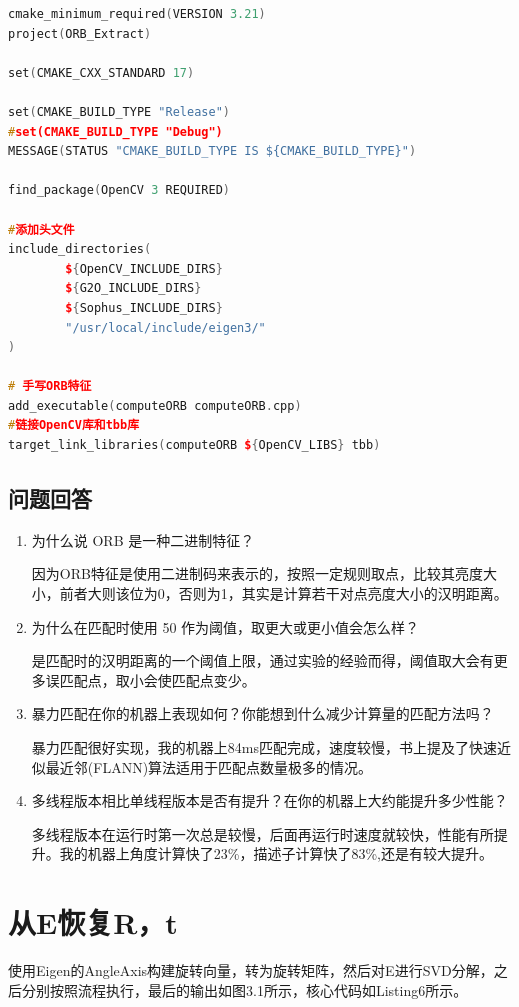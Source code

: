 \documentclass[40pt,a4paper，UTF8]{ctexart}
\numberwithin{equation}{section}
\begin{document}
\begin{lstlisting}[language=C++, caption=CMakeLists.txt]
cmake_minimum_required(VERSION 3.21)
project(ORB_Extract)

set(CMAKE_CXX_STANDARD 17)

set(CMAKE_BUILD_TYPE "Release")
#set(CMAKE_BUILD_TYPE "Debug")
MESSAGE(STATUS "CMAKE_BUILD_TYPE IS ${CMAKE_BUILD_TYPE}")

find_package(OpenCV 3 REQUIRED)

#添加头文件
include_directories(
        ${OpenCV_INCLUDE_DIRS}
        ${G2O_INCLUDE_DIRS}
        ${Sophus_INCLUDE_DIRS}
        "/usr/local/include/eigen3/"
)

# 手写ORB特征
add_executable(computeORB computeORB.cpp)
#链接OpenCV库和tbb库
target_link_libraries(computeORB ${OpenCV_LIBS} tbb)
\end{lstlisting}


\subsection{问题回答}
\begin{enumerate}
\item 为什么说 ORB 是一种二进制特征？

因为ORB特征是使用二进制码来表示的，按照一定规则取点，比较其亮度大小，前者大则该位为0，否则为1，其实是计算若干对点亮度大小的汉明距离。
\item 为什么在匹配时使用 50 作为阈值，取更大或更小值会怎么样？

是匹配时的汉明距离的一个阈值上限，通过实验的经验而得，阈值取大会有更多误匹配点，取小会使匹配点变少。

\item 暴力匹配在你的机器上表现如何？你能想到什么减少计算量的匹配方法吗？

暴力匹配很好实现，我的机器上84ms匹配完成，速度较慢，书上提及了快速近似最近邻(FLANN)算法适用于匹配点数量极多的情况。

\item 多线程版本相比单线程版本是否有提升？在你的机器上大约能提升多少性能？

多线程版本在运行时第一次总是较慢，后面再运行时速度就较快，性能有所提升。我的机器上角度计算快了23\%，描述子计算快了83\%,还是有较大提升。
\end{enumerate}

\section{从E恢复R，t}
使用Eigen的AngleAxis构建旋转向量，转为旋转矩阵，然后对E进行SVD分解，之后分别按照流程执行，最后的输出如图3.1所示，核心代码如Listing6所示。
\end{document}
